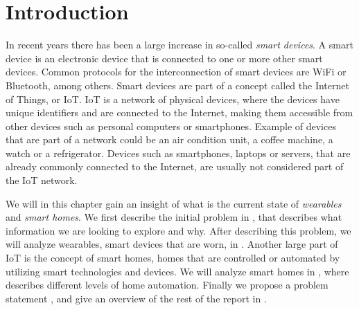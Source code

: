 \chapter{Introduction}\label{chap:introduction}
In recent years there has been a large increase in so-called \emph{smart devices}. 
A smart device is an electronic device that is connected to one or more other smart devices. 
Common protocols for the interconnection of smart devices are WiFi or Bluetooth, among others.
Smart devices are part of a concept called the Internet of Things, or IoT. 
IoT is a network of physical devices, 
where the devices have unique identifiers and are connected to the Internet, 
making them accessible from other devices such as personal computers or smartphones. 
Example of devices that are part of a network could be an air condition unit, a coffee machine, a watch or a refrigerator. 
Devices such as smartphones, laptops or servers, 
that are already commonly connected to the Internet, 
are usually not considered part of the IoT network. 

We will in this chapter gain an insight of what is the current state of \emph{wearables} and \emph{smart homes}. 
We first describe the initial problem in , 
that describes what information we are looking to explore and why. 
After describing this problem, we will analyze wearables, 
\ie smart devices that are worn, in .
Another large part of IoT is the concept of smart homes, 
\ie homes that are controlled or automated by utilizing smart technologies and devices. 
We will analyze smart homes in , 
where  describes different levels of home automation. 
Finally we propose a problem statement , 
and give an overview of the rest of the report in .








